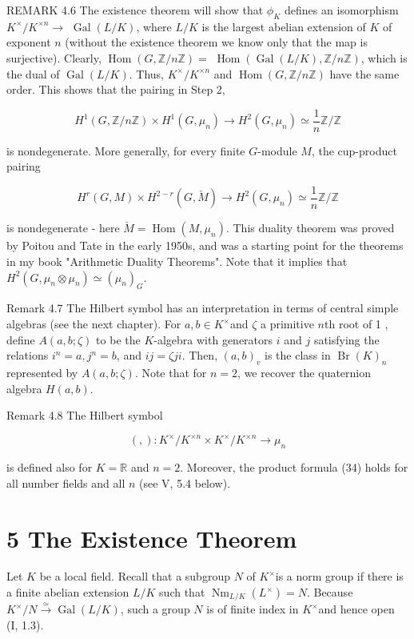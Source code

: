 \documentclass[10pt]{article}
\begin{document}
REMARK 4.6 The existence theorem will show that $\phi_{K}$ defines an isomorphism $K^{\times} / K^{\times n} \rightarrow$ $\operatorname{Gal}(L / K)$, where $L / K$ is the largest abelian extension of $K$ of exponent $n$ (without the existence theorem we know only that the map is surjective). Clearly, $\operatorname{Hom}(G, \mathbb{Z} / n \mathbb{Z})=$ $\operatorname{Hom}(\operatorname{Gal}(L / K), \mathbb{Z} / n \mathbb{Z})$, which is the dual of $\operatorname{Gal}(L / K)$. Thus, $K^{\times} / K^{\times n}$ and $\operatorname{Hom}(G, \mathbb{Z} / n \mathbb{Z})$ have the same order. This shows that the pairing in Step 2,

$$
H^{1}(G, \mathbb{Z} / n \mathbb{Z}) \times H^{1}\left(G, \mu_{n}\right) \rightarrow H^{2}\left(G, \mu_{n}\right) \simeq \frac{1}{n} \mathbb{Z} / \mathbb{Z}
$$

is nondegenerate. More generally, for every finite $G$-module $M$, the cup-product pairing

$$
H^{r}(G, M) \times H^{2-r}(G, \check{M}) \rightarrow H^{2}\left(G, \mu_{n}\right) \simeq \frac{1}{n} \mathbb{Z} / \mathbb{Z}
$$

is nondegenerate - here $\check{M}=\operatorname{Hom}\left(M, \mu_{n}\right)$. This duality theorem was proved by Poitou and Tate in the early 1950s, and was a starting point for the theorems in my book "Arithmetic Duality Theorems". Note that it implies that $H^{2}\left(G, \mu_{n} \otimes \mu_{n}\right) \simeq\left(\mu_{n}\right)_{G}$.

Remark 4.7 The Hilbert symbol has an interpretation in terms of central simple algebras (see the next chapter). For $a, b \in K^{\times}$and $\zeta$ a primitive $n$th root of 1 , define $A(a, b ; \zeta)$ to be the $K$-algebra with generators $i$ and $j$ satisfying the relations $i^{n}=a, j^{n}=b$, and $i j=\zeta j i$. Then, $(a, b)_{v}$ is the class in $\operatorname{Br}(K)_{n}$ represented by $A(a, b ; \zeta)$. Note that for $n=2$, we recover the quaternion algebra $H(a, b)$.

Remark 4.8 The Hilbert symbol

$$
(,): K^{\times} / K^{\times n} \times K^{\times} / K^{\times n} \rightarrow \mu_{n}
$$

is defined also for $K=\mathbb{R}$ and $n=2$. Moreover, the product formula (34) holds for all number fields and all $n$ (see V, 5.4 below).

\section*{5 The Existence Theorem}
Let $K$ be a local field. Recall that a subgroup $N$ of $K^{\times}$is a norm group if there is a finite abelian extension $L / K$ such that $\operatorname{Nm}_{L / K}\left(L^{\times}\right)=N$. Because $K^{\times} / N \xrightarrow{\simeq} \operatorname{Gal}(L / K)$, such a group $N$ is of finite index in $K^{\times}$and hence open (I, 1.3).
\end{document}
